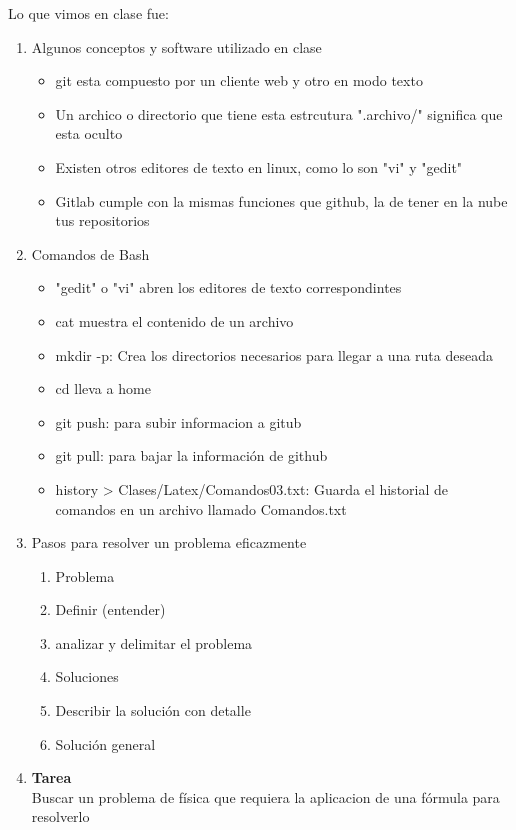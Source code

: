 \documentclass[letterpaper, 12pt, oneside]{article}%
\begin{document}
Lo que vimos en clase fue:%
\begin{enumerate}%
	\item Algunos conceptos y software utilizado en clase%
		\begin{itemize}
			\item git esta compuesto por un cliente web y otro en modo texto
			\item Un archico o directorio que tiene esta estrcutura ".archivo/" significa que esta oculto
			\item Existen otros editores de texto en linux, como lo son "vi" y "gedit"
			\item Gitlab cumple con la mismas funciones que github, la de tener en la nube tus repositorios
		\end{itemize}
	
	\item Comandos de Bash%
	\begin{itemize}%
		\item "gedit" o "vi" abren los editores de texto correspondintes
		\item cat muestra el contenido de un archivo
		\item mkdir -p: Crea los directorios necesarios para llegar a una ruta deseada
		\item cd lleva a home
		\item git push: para subir informacion a gitub
		\item git pull: para bajar la información de github
		\item history > Clases/Latex/Comandos03.txt:  Guarda el historial de comandos en un archivo llamado Comandos.txt
		
				
	\end{itemize}%
	\item Pasos para resolver un problema eficazmente
		\begin{enumerate}
			\item Problema
			\item Definir (entender)
			\item analizar y delimitar el problema
			\item Soluciones
			\item Describir la solución con detalle
			\item Solución general
		\end{enumerate}
	\item \textbf{Tarea}
	\\
	Buscar un problema de física que requiera la aplicacion de una fórmula para resolverlo
		
	
\end{enumerate}%
	
\end{document}
